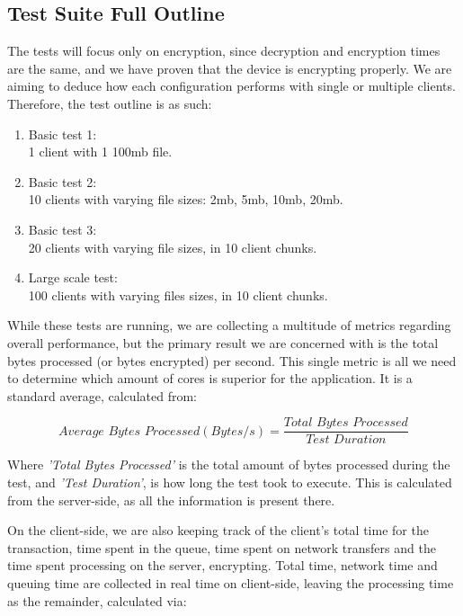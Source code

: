 \subsection{Test Suite Full Outline}
The tests will focus only on encryption, since decryption and encryption times are the same, and we have proven that the device is encrypting properly. We are aiming to deduce how each configuration performs with single or multiple clients. Therefore, the test outline is as such:
\begin{enumerate}
    \item Basic test 1: \\
    1 client with 1 100mb file.
    \item Basic test 2: \\
    10 clients with varying file sizes: 2mb, 5mb, 10mb, 20mb.
    \item Basic test 3: \\
    20 clients with varying file sizes, in 10 client chunks.
    \item Large scale test: \\
    100 clients with varying files sizes, in 10 client chunks.
\end{enumerate}


While these tests are running, we are collecting a multitude of metrics regarding overall performance, but the primary result we are concerned with is the total bytes processed (or bytes encrypted) per second. This single metric is all we need to determine which amount of cores is superior for the application. It is a standard average, calculated from:

$$\textit{Average Bytes Processed}(Bytes/s)=\frac{\textit{Total Bytes Processed}}{\textit{Test Duration}}$$

Where \textit{'Total Bytes Processed'} is the total amount of bytes processed during the test, and \textit{'Test Duration'}, is how long the test took to execute. This is calculated from the server-side, as all the information is present there.

On the client-side, we are also keeping track of the client's total time for the transaction, time spent in the queue, time spent on network transfers and the time spent processing on the server, \ie encrypting. Total time, network time and queuing time are collected in real time on client-side, leaving the processing time as the remainder, calculated via:


